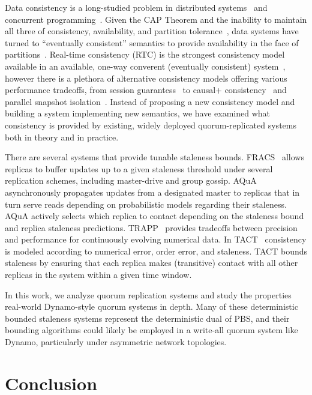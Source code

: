 \documentclass{vldb}
\begin{document}
Data consistency is a long-studied problem in distributed
systems~\cite{consistency-partitioned, danger-rep} and concurrent
programming~\cite{linearizability}.  Given the CAP Theorem and the
inability to maintain all three of consistency, availability, and
partition tolerance~\cite{cap-proof}, data systems have turned to
``eventually consistent'' semantics to provide availability in the
face of partitions~\cite{consistency-partitioning, vogels-defs}.
Real-time consistency (RTC) is the strongest consistency model
available in an available, one-way converent (eventually consistent)
system~\cite{rtc-proof}, however there is a plethora of alternative
consistency models offering various performance tradeoffs, from
session guarantess~\cite{sessionguarantees} to causal+
consistency~\cite{cops} and parallel snapshot isolation~\cite{walter}.
Instead of proposing a new consistency model and building a system
implementing new semantics, we have examined what consistency is
provided by existing, widely deployed quorum-replicated systems both
in theory and in practice.

There are several systems that provide tunable staleness bounds.
FRACS~\cite{frac} allows replicas to buffer updates up to a given
staleness threshold under several replication schemes, including
master-drive and group gossip.  AQuA~\cite{aqua} asynchronously
propagates updates from a designated master to replicas that in turn
serve reads depending on probabilistic models regarding their
staleness.  AQuA actively selects which replica to contact depending
on the staleness bound and replica staleness predictions.
TRAPP~\cite{trapp} provides tradeoffs between precision and
performance for continuously evolving numerical data.  In
TACT~\cite{vahdat-article, vahdat-bounded} consistency is modeled
according to numerical error, order error, and staleness.  TACT bounds
staleness by ensuring that each replica makes (transitive) contact
with all other replicas in the system within a given time window.

In this work, we analyze quorum replication systems and study the
properties real-world Dynamo-style quorum systems in depth.  Many of
these deterministic bounded staleness systems represent the
deterministic dual of PBS, and their bounding algorithms could likely
be employed in a write-all quorum system like Dynamo, particularly
under asymmetric network topologies.


\section{Conclusion}
\label{sec:conclusion}
\end{document}

